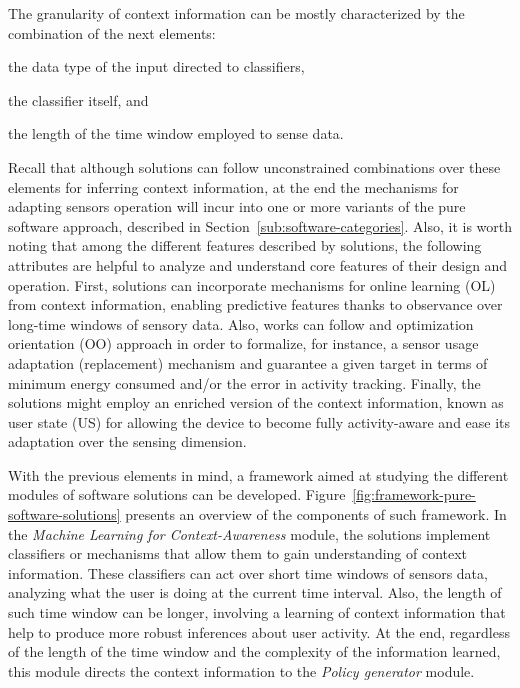 \documentclass[ENG,PhD]{cinvestav}
\begin{document}
The granularity of context information can be mostly characterized by the combination of the next elements: 
\begin{listahorizontal}
  \item the data type of the input directed to classifiers,
  \item the classifier itself, and
  \item the length of the time window employed to sense data.
\end{listahorizontal}
Recall that although solutions can follow unconstrained combinations over these elements for inferring context information, at the end the mechanisms for adapting sensors operation will incur into one or more variants of the pure software approach, described in Section~\ref{sub:software-categories}.
Also, it is worth noting that among the different features described by solutions, the following attributes are helpful to analyze and understand core features of their design and operation.
First, solutions can incorporate mechanisms for online learning (OL) from context information, enabling predictive features thanks to observance over long-time windows of sensory data.
Also, works can follow and optimization orientation (OO) approach in order to formalize, for instance, a sensor usage adaptation (replacement) mechanism and guarantee a given target in terms of minimum energy consumed and/or the error in activity tracking.
Finally, the solutions might employ an enriched version of the context information, known as user state (US) for allowing the device to become fully activity-aware and ease its adaptation over the sensing dimension.

With the previous elements in mind, a framework aimed at studying the different modules of software solutions can be developed.
Figure~\ref{fig:framework-pure-software-solutions} presents an overview of the components of such framework.
In the \emph{Machine Learning for Context-Awareness} module, the solutions implement classifiers or mechanisms that allow them to gain understanding of context information.
These classifiers can act over short time windows of sensors data, analyzing what the user is doing at the current time interval.
Also, the length of such time window can be longer, involving a learning of context information that help to produce more robust inferences about user activity.
At the end, regardless of the length of the time window and the complexity of the information learned, this module directs the context information to the \emph{Policy generator} module.
\end{document}

